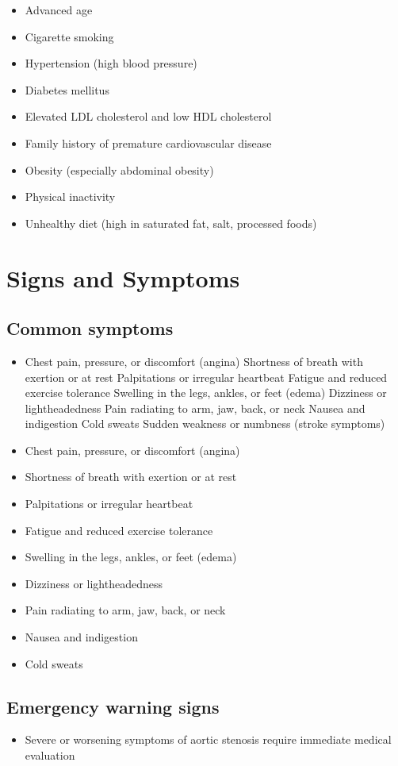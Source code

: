 \begin{itemize}[noitemsep]
  \item Advanced age
  \item Cigarette smoking
  \item Hypertension (high blood pressure)
  \item Diabetes mellitus
  \item Elevated LDL cholesterol and low HDL cholesterol
  \item Family history of premature cardiovascular disease
  \item Obesity (especially abdominal obesity)
  \item Physical inactivity
  \item Unhealthy diet (high in saturated fat, salt, processed foods)
\end{itemize}
\section{Signs and Symptoms}

\subsection{Common symptoms}
\begin{itemize}[noitemsep]
  \item Chest pain, pressure, or discomfort (angina) Shortness of breath with exertion or at rest Palpitations or irregular heartbeat Fatigue and reduced exercise tolerance Swelling in the legs, ankles, or feet (edema) Dizziness or lightheadedness Pain radiating to arm, jaw, back, or neck Nausea and indigestion Cold sweats Sudden weakness or numbness (stroke symptoms)
  \item Chest pain, pressure, or discomfort (angina)
  \item Shortness of breath with exertion or at rest
  \item Palpitations or irregular heartbeat
  \item Fatigue and reduced exercise tolerance
  \item Swelling in the legs, ankles, or feet (edema)
  \item Dizziness or lightheadedness
  \item Pain radiating to arm, jaw, back, or neck
  \item Nausea and indigestion
  \item Cold sweats
\end{itemize}

\subsection{Emergency warning signs}
\begin{itemize}[noitemsep]
  \item Severe or worsening symptoms of aortic stenosis require immediate medical evaluation
\end{itemize}
